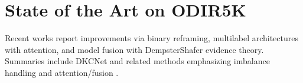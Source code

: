 \section{State of the Art on ODIR\textendash 5K}
Recent works report improvements via binary re\textendash framing, multi\textendash label architectures with attention, and model fusion with Dempster\textendash Shafer evidence theory. Summaries include DKCNet and related methods emphasizing imbalance handling and attention/fusion \cite{docxRef41,docxRef42,docxRef43}.


